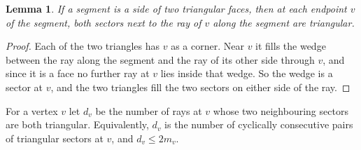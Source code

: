 \documentclass[11pt]{article}
\newtheorem{lemma}{Lemma}
\theoremstyle{definition}
\theoremstyle{remark}
\begin{document}
\begin{lemma}\label{lem:sectors}
If a segment is a side of two triangular faces, then at each endpoint $v$ of the segment, both
sectors next to the ray of $v$ along the segment are triangular.
\end{lemma}
\begin{proof}
Each of the two triangles has $v$ as a corner. Near $v$ it fills the wedge between the ray along the
segment and the ray of its other side through $v$, and since it is a face no further ray at $v$ lies
inside that wedge. So the wedge is a sector at $v$, and the two triangles fill the two sectors on
either side of the ray.
\end{proof}

For a vertex $v$ let $d_v$ be the number of rays at $v$ whose two neighbouring sectors are both
triangular. Equivalently, $d_v$ is the number of cyclically consecutive pairs of triangular sectors
at $v$, and $d_v \le 2m_v$.
\end{document}
